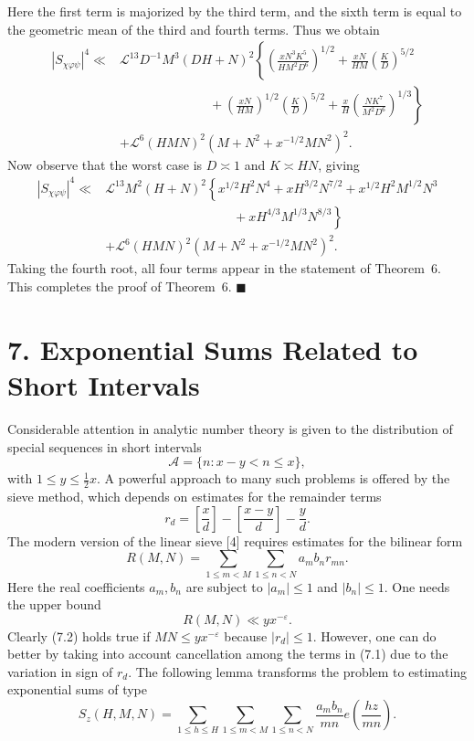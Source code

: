 \documentclass[10pt]{article}
\begin{document}
Here the first term is majorized by the third term, and the sixth term is
equal to the geometric mean of the third and fourth terms. Thus we obtain
\[
\begin{aligned}
|S_{\chi\varphi\psi}|^4\ll{}&\mathscr L^{13}D^{-1}M^3(DH+N)^2
 \left\{\left(\frac{xN^3K^5}{HM^2D^6}\right)^{1/2}
 +\frac{xN}{HM}\left(\frac KD\right)^{5/2}\right.\\
&\left.\hspace{7em}
 +\left(\frac{xN}{HM}\right)^{1/2}\left(\frac KD\right)^{5/2}
 +\frac{x}{H}\left(\frac{NK^7}{M^2D^6}\right)^{1/3}\right\}\\
&+\mathscr L^6(HMN)^2\left(M+N^2+x^{-1/2}MN^2\right)^2.
\end{aligned}
\]
Now observe that the worst case is $D\asymp1$ and $K\asymp HN$, giving
\[
\begin{aligned}
|S_{\chi\varphi\psi}|^4\ll{}&\mathscr L^{13}M^2(H+N)^2
 \left\{x^{1/2}H^2N^4+xH^{3/2}N^{7/2}
 +x^{1/2}H^2M^{1/2}N^3\right.\\
&\left.\hspace{10em}{}+xH^{4/3}M^{1/3}N^{8/3}\right\}\\
&+\mathscr L^6(HMN)^2\left(M+N^2+x^{-1/2}MN^2\right)^2.
\end{aligned}
\]
Taking the fourth root, all four terms appear in the statement of
Theorem~6. This completes the proof of Theorem~6. \(\blacksquare\)

\section*{7. Exponential Sums Related to Short Intervals}
Considerable attention in analytic number theory is given to the
distribution of special sequences in short intervals
\[
 \mathscr A=\{n:x-y<n\le x\},
\]
with $1\le y\le\frac12x$. A powerful approach to many such problems is
offered by the sieve method, which depends on estimates for the remainder
terms
\[
 r_d=\left[\frac xd\right]-\left[\frac{x-y}{d}\right]-\frac yd.
\]
The modern version of the linear sieve [4] requires estimates for the
bilinear form
\begin{equation*}
 R(M,N)=\sum_{1\le m<M}\sum_{1\le n<N}a_mb_nr_{mn}.
\tag{7.1}
\end{equation*}
Here the real coefficients $a_m,b_n$ are subject to $|a_m|\le1$ and
$|b_n|\le1$. One needs the upper bound
\begin{equation*}
 R(M,N)\ll yx^{-\varepsilon}.
\tag{7.2}
\end{equation*}
Clearly (7.2) holds true if $MN\le yx^{-\varepsilon}$ because $|r_d|\le1$.
However, one can do better by taking into account cancellation among the
terms in (7.1) due to the variation in sign of $r_d$. The following lemma
transforms the problem to estimating exponential sums of type
\[
 S_z(H,M,N)=\sum_{1\le h\le H}\sum_{1\le m<M}\sum_{1\le n<N}
 \frac{a_mb_n}{mn}e\left(\frac{hz}{mn}\right).
\]
\end{document}
